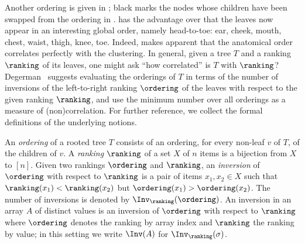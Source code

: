 \documentclass{toc}
\begin{document}
Another ordering is given in ; black marks the nodes whose children have been swapped from the ordering in .  has the advantage over  that the leaves now appear in an interesting global order, namely head-to-toe: ear, cheek, mouth, chest, waist, thigh, knee, toe. Indeed,  makes apparent that the anatomical order correlates perfectly with the clustering. In general, given a tree $T$ and a ranking $\ranking$ of its leaves, one might ask ``how correlated'' is $T$ with $\ranking$? Degerman~\cite{Degerman1982} suggests evaluating the orderings of $T$ in terms of the number of inversions of the left-to-right ranking $\ordering$ of the leaves with respect to the given ranking $\ranking$, and use the minimum number over all orderings as a measure of (non)correlation. For further reference, we collect the formal definitions of the underlying notions.
\begin{definition}
An \emph{ordering} of a rooted tree $T$ consists of an ordering, for every non-leaf $v$ of $T$, of the children of $v$. 
A \emph{ranking} $\ranking$ of a set $X$ of $n$ items is a bijection from $X$ to $[n]$. 
Given two rankings $\ordering$ and $\ranking$, an \emph{inversion} of $\ordering$ with respect to $\ranking$ is a pair of items $x_1,x_2\in X$ such that $\ranking(x_1) < \ranking(x_2)$ but $\ordering(x_1) > \ordering(x_2)$. The number of inversions is denoted by $\Inv_\ranking(\ordering)$.
An inversion in an array $A$ of
%
%
%
distinct values is an inversion of $\ordering$ with respect to $\ranking$ where $\ordering$ denotes the ranking by array index and $\ranking$ the ranking by value; in this setting we write $\Inv(A)$ for $\Inv_\ranking(\sigma)$.
\end{definition}
\end{document}
